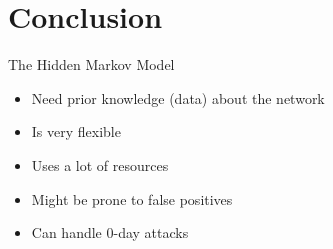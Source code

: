 \section{Conclusion}
\begin{frame}
The Hidden Markov Model
	\begin{itemize}
		\item Need prior knowledge (data) about the network		
		\item Is very flexible
		\item Uses a lot of resources
		\item Might be prone to false positives
		\item Can handle 0-day attacks
	\end{itemize}

\end{frame}